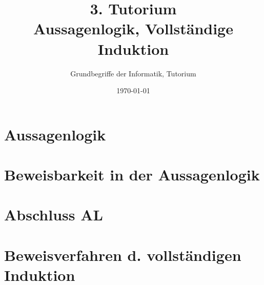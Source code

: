 




\title[Aussagenlogik, Vollständige Induktion]{3. Tutorium\\ Aussagenlogik, Vollständige Induktion}
\subtitle{Grundbegriffe der Informatik, Tutorium \hashtag\mytutnumber}
\date{\today}
\usepackage{tikz}


\titleframe




\roadmap

\section{Aussagenlogik}



\section{Beweisbarkeit in der Aussagenlogik}



\section{Abschluss AL}



\section[Vollständige Induktion]{Beweisverfahren d. vollständigen Induktion}






